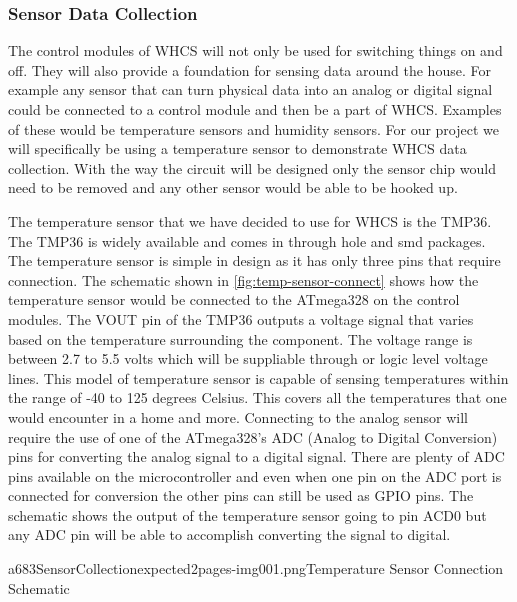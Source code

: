 
\subsubsection{Sensor Data Collection}
The control modules of WHCS will not only be used for switching things on and
off. They will also provide a foundation for sensing data around the house. For
example any sensor that can turn physical data into an analog or digital signal
could be connected to a control module and then be a part of WHCS. Examples of
these would be temperature sensors and humidity sensors. For our project we
will specifically be using a temperature sensor to demonstrate WHCS data
collection. With the way the circuit will be designed only the sensor chip
would need to be removed and any other sensor would be able to be hooked up.

The temperature sensor that we have decided to use for WHCS is the TMP36. The
TMP36 is widely available and comes in through hole and smd packages. The
temperature sensor is simple in design as it has only three pins that require
connection. The schematic shown in \autoref{fig:temp-sensor-connect} shows how the
temperature sensor would be connected to the ATmega328 on the control modules.
The VOUT pin of the TMP36 outputs a voltage signal that varies based on the
temperature surrounding the component. The voltage range is between 2.7 to 5.5
volts which will be suppliable through or logic level voltage lines. This model
of temperature sensor is capable of sensing temperatures within the range of
{}-40 to 125 degrees Celsius. This covers all the temperatures that one would
encounter in a home and more. Connecting to the analog sensor will require the
use of one of the ATmega328's ADC (Analog to Digital Conversion) pins for
converting the analog signal to a digital signal. There are plenty of ADC pins
available on the microcontroller and even when one pin on the ADC port is
connected for conversion the other pins can still be used as GPIO pins. The
schematic shows the output of the temperature sensor going to pin ACD0 but any
ADC pin will be able to accomplish converting the signal to digital.

{a683SensorCollectionexpected2pages-img001.png}{Temperature Sensor Connection Schematic}

